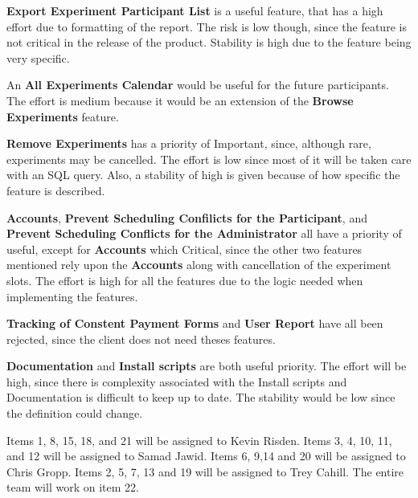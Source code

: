 \textbf{Export Experiment Participant List} is a useful feature, that has a high effort due to formatting of the report.  The risk is low though, since the feature is not critical in the release of the product.  Stability is high due to the feature being very specific.

An \textbf{All Experiments Calendar} would be useful for the future participants.  The effort is medium because it would be an extension of the \textbf{Browse Experiments} feature.

\textbf{Remove Experiments} has a priority of Important, since, although rare, experiments may be cancelled. The effort is low since most of it will be taken care with an SQL query.  Also, a stability of high is given because of  how specific the feature is described.

\textbf{Accounts}, \textbf{Prevent Scheduling Confilicts for the Participant}, and \textbf{Prevent Scheduling Conflicts for the Administrator} all have a priority of useful, except for \textbf{Accounts} which Critical, since the other two features mentioned rely upon the \textbf{Accounts} along with cancellation of the experiment slots.  The effort is high for all the features due to the logic needed when implementing the features.  

\textbf{Tracking of Constent Payment Forms} and \textbf{User Report} have all been rejected, since the client does not need theses features.

\textbf{Documentation} and \textbf{Install scripts} are both useful priority.  The effort will be high, since there is complexity associated with the Install scripts and Documentation is difficult to keep up to date.  The stability would be low since the definition could change.

Items 1, 8, 15, 18, and 21 will be assigned to Kevin Risden.  Items 3, 4, 10, 11, and 12 will be assigned to Samad Jawid.  Items 6, 9,14 and 20  will be assigned to Chris Gropp.  Items 2, 5, 7, 13 and 19 will be assigned to Trey Cahill.  The entire team will work on item 22.
